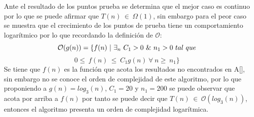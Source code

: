 \documentclass[12pt,twoside]{article}
\begin{document}
                Ante el resultado de los puntos prueba se determina que el mejor caso es continuo por lo que se puede afirmar que $T(n)~\in~\Omega(1)$, sin embargo para el peor caso se muestra que el crecimiento de los puntos de prueba tiene un comportamiento logar\'itmico por lo que recordando la definici\'on de $\mathcal{O}$:
                $$\mathcal{O}(g(n)) = \{ f(n)~\arrowvert~\exists_{n}~C_{1}>0~\&~n_{1}>0~tal~que$$$$0\leq~f(n)~\leq~C_{1}g(n)~\forall~n\geq~n_{1}\}$$
                Se tiene que $f(n)$ es la funci\'on que acota los resultados no encontrados en A[], sin embargo no se conoce el orden de complejidad de este algoritmo, por lo que proponiendo a $g(n)=log_{3}(n)$, $C_{1}=20$ y $n_{1}=200$ se puede observar que acota por arriba a $f(n)$ por tanto se puede decir que $T(n)~\in~\mathcal{O}(log_{3}(n))$, entonces el algoritmo presenta un orden de complejidad logar\'itmica.
\end{document}
